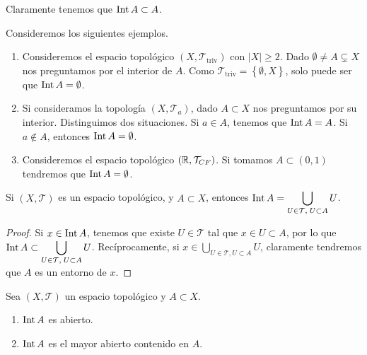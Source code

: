 \begin{observation}
Claramente tenemos que $\displaystyle \operatorname{Int} A \subset A $. 
\end{observation}
\begin{eg}
	Consideremos los siguientes ejemplos.
	\begin{enumerate}
	\item Consideremos el espacio topológico $\displaystyle \left(X, \mathcal{T}_{\text{triv}}\right) $ con $\displaystyle \left|X \right|\geq 2 $. Dado $\displaystyle \emptyset \neq A \subsetneq X $ nos preguntamos por el interior de $\displaystyle A $. Como $\displaystyle \mathcal{T}_{\text{triv}} = \left\{ \emptyset, X\right\}  $, solo puede ser que $\displaystyle \operatorname{Int} A = \emptyset $.
	\item Si consideramos la topología $\displaystyle \left(X, \mathcal{T}_{a}\right) $, dado $\displaystyle A \subset X $ nos preguntamos por su interior. Distinguimos dos situaciones. Si $\displaystyle a \in A $, tenemos que $\displaystyle \operatorname{Int} A = A $. Si $\displaystyle a \not\in A $, entonces $\displaystyle \operatorname{Int} A = \emptyset $. 
	\item Consideremos el espacio topológico $\displaystyle \left(\mathbb{R}, \mathcal{T}_{CF}\right) $. Si tomamos $\displaystyle A \subset \left(0,1\right) $ tendremos que $\displaystyle \operatorname{Int} A = \emptyset $. 
	\end{enumerate}
\end{eg}
\begin{prop}
Si $\displaystyle \left(X, \mathcal{T}\right) $ es un espacio topológico, y $\displaystyle A \subset X $, entonces $\displaystyle \operatorname{Int} A = \bigcup_{U \in \mathcal{T}, \; U \subset A}U $. 
\end{prop}
\begin{proof}
Si $\displaystyle x \in \operatorname{Int} A $, tenemos que existe $\displaystyle U \in \mathcal{T} $ tal que $\displaystyle x \in U \subset A $, por lo que $\displaystyle \operatorname{Int} A \subset \bigcup_{U\in\mathcal{T}, \; U \subset A}U $. Recíprocamente, si $\displaystyle x \in \bigcup_{U \in \mathcal{T}, U \subset A}U $, claramente tendremos que $\displaystyle A $ es un entorno de $\displaystyle x $. 
\end{proof}
\begin{colorary}
Sea $\displaystyle \left(X, \mathcal{T}\right) $ un espacio topológico y $\displaystyle A \subset X $. 
\begin{enumerate}
\item $\displaystyle \operatorname{Int} A $ es abierto.
\item $\displaystyle \operatorname{Int} A $ es el mayor abierto contenido en $\displaystyle A $. 
\end{enumerate}
\end{colorary}

